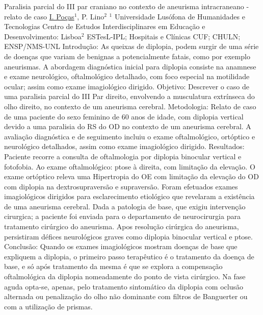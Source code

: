 
    \begin{abstract_online}{Paralisia parcial do III par craniano  no contexto de aneurisma intracraneano  - relato de caso }{%
        \underline{I. Poças}$^{1}$, P. Lino$^{2}$}{%
        }{%
        $^1$ Universidade Lusófona de Humanidades e Tecnologias Centro de Estudos Interdisciplinares em Educação e Desenvolvimento: Lisboa\newline{}$^2$ ESTesL-IPL; Hospitais e Clínicas CUF; CHULN; ENSP/NMS-UNL}
        Introdução: As queixas de diplopia, podem surgir de uma série de doenças que variam de benignas a potencialmente fatais, como por exemplo aneurismas. A abordagem diagnóstica inicial para diplopia consiste na anamnese e exame neurológico, oftalmológico detalhado, com foco especial na motilidade ocular; assim como exame imagiológico dirigido. 
        Objetivo: Descrever o caso de uma paralisia parcial do III Par direito, envolvendo a musculatura extrínseca do olho direito, no contexto de um aneurisma cerebral. 
        Metodologia:  Relato de caso de uma paciente do sexo feminino de 60 anos de idade, com diplopia vertical devido a uma paralisia do RS do OD no contexto de um aneurisma cerebral. A avaliação diagnóstica e de seguimento incluiu o exame oftalmológico, ortóptico e neurológico detalhados, assim como exame imagiológico dirigido. Resultados: Paciente recorre a consulta de oftalmologia por diplopia binocular vertical e fotofobia. Ao exame oftalmológico: ptose à direita, com limitação da elevação. O exame ortóptico releva uma Hipertropia do OE com limitação da elevação do OD  com diplopia na dextrosupraversão e supraversão. Foram efetuados exames imagiológicos dirigidos para esclarecimento etiológico que revelaram a existência de uma aneurisma cerebral. 
        Dada a patologia de base, que exigiu intervenção cirurgica; a paciente foi enviada para o departamento de neurocirurgia para tratamento  cirúrgico do aneurisma. Apos resolução  cirúrgica do aneurisma, persistiram défices neurológicos graves como diplopia binocular vertical e  ptose. 
        Conclusão: Quando os exames imagiológicos mostram doenças de base que expliquem a diplopia,  o primeiro passo terapêutico é o tratamento da doença de base, e só após tratamento da mesma é que se explora a compensação oftalmológica da diplopia nomeadamente do ponto de vista cirúrgico. Na fase aguda opta-se, apenas,  pelo tratamento sintomático da diplopia com oclusão alternada ou penalização do olho não dominante com filtros de Banguerter ou  com a utilização de prismas.
    \end{abstract_online}
    